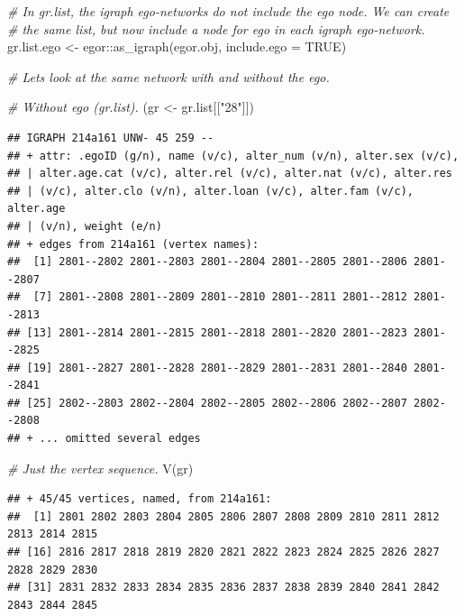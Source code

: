\documentclass[
]{book}
\newenvironment{Shaded}{\begin{snugshade}}{\end{snugshade}}
\newcommand{\AttributeTok}[1]{\textcolor[rgb]{0.77,0.63,0.00}{#1}}
\newcommand{\CommentTok}[1]{\textcolor[rgb]{0.56,0.35,0.01}{\textit{#1}}}
\newcommand{\ConstantTok}[1]{\textcolor[rgb]{0.00,0.00,0.00}{#1}}
\newcommand{\FunctionTok}[1]{\textcolor[rgb]{0.00,0.00,0.00}{#1}}
\newcommand{\NormalTok}[1]{#1}
\newcommand{\OtherTok}[1]{\textcolor[rgb]{0.56,0.35,0.01}{#1}}
\newcommand{\SpecialCharTok}[1]{\textcolor[rgb]{0.00,0.00,0.00}{#1}}
\newcommand{\StringTok}[1]{\textcolor[rgb]{0.31,0.60,0.02}{#1}}
\begin{document}
\begin{Shaded}
\begin{Highlighting}[]
\CommentTok{\# In gr.list, the igraph ego{-}networks do not include the ego node. We can create}
\CommentTok{\# the same list, but now include a node for ego in each igraph ego{-}network.}
\NormalTok{gr.list.ego }\OtherTok{\textless{}{-}}\NormalTok{ egor}\SpecialCharTok{::}\FunctionTok{as\_igraph}\NormalTok{(egor.obj, }\AttributeTok{include.ego =} \ConstantTok{TRUE}\NormalTok{)}

\CommentTok{\# Let\textquotesingle{}s look at the same network with and without the ego.}

\CommentTok{\# Without ego (gr.list).}
\NormalTok{(gr }\OtherTok{\textless{}{-}}\NormalTok{ gr.list[[}\StringTok{"28"}\NormalTok{]])}
\end{Highlighting}
\end{Shaded}

\begin{verbatim}
## IGRAPH 214a161 UNW- 45 259 -- 
## + attr: .egoID (g/n), name (v/c), alter_num (v/n), alter.sex (v/c),
## | alter.age.cat (v/c), alter.rel (v/c), alter.nat (v/c), alter.res
## | (v/c), alter.clo (v/n), alter.loan (v/c), alter.fam (v/c), alter.age
## | (v/n), weight (e/n)
## + edges from 214a161 (vertex names):
##  [1] 2801--2802 2801--2803 2801--2804 2801--2805 2801--2806 2801--2807
##  [7] 2801--2808 2801--2809 2801--2810 2801--2811 2801--2812 2801--2813
## [13] 2801--2814 2801--2815 2801--2818 2801--2820 2801--2823 2801--2825
## [19] 2801--2827 2801--2828 2801--2829 2801--2831 2801--2840 2801--2841
## [25] 2802--2803 2802--2804 2802--2805 2802--2806 2802--2807 2802--2808
## + ... omitted several edges
\end{verbatim}

\begin{Shaded}
\begin{Highlighting}[]
\CommentTok{\# Just the vertex sequence.}
\FunctionTok{V}\NormalTok{(gr)}
\end{Highlighting}
\end{Shaded}

\begin{verbatim}
## + 45/45 vertices, named, from 214a161:
##  [1] 2801 2802 2803 2804 2805 2806 2807 2808 2809 2810 2811 2812 2813 2814 2815
## [16] 2816 2817 2818 2819 2820 2821 2822 2823 2824 2825 2826 2827 2828 2829 2830
## [31] 2831 2832 2833 2834 2835 2836 2837 2838 2839 2840 2841 2842 2843 2844 2845
\end{verbatim}
\end{document}
